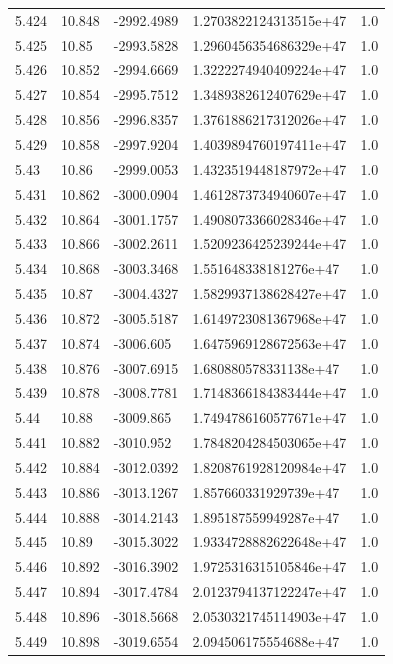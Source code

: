 \begin{tabular}{lllll}
5.424 & 10.848 & -2992.4989 & 1.2703822124313515e+47 & 1.0 \\
5.425 & 10.85 & -2993.5828 & 1.2960456354686329e+47 & 1.0 \\
5.426 & 10.852 & -2994.6669 & 1.3222274940409224e+47 & 1.0 \\
5.427 & 10.854 & -2995.7512 & 1.3489382612407629e+47 & 1.0 \\
5.428 & 10.856 & -2996.8357 & 1.3761886217312026e+47 & 1.0 \\
5.429 & 10.858 & -2997.9204 & 1.4039894760197411e+47 & 1.0 \\
5.43 & 10.86 & -2999.0053 & 1.4323519448187972e+47 & 1.0 \\
5.431 & 10.862 & -3000.0904 & 1.4612873734940607e+47 & 1.0 \\
5.432 & 10.864 & -3001.1757 & 1.4908073366028346e+47 & 1.0 \\
5.433 & 10.866 & -3002.2611 & 1.5209236425239244e+47 & 1.0 \\
5.434 & 10.868 & -3003.3468 & 1.551648338181276e+47 & 1.0 \\
5.435 & 10.87 & -3004.4327 & 1.5829937138628427e+47 & 1.0 \\
5.436 & 10.872 & -3005.5187 & 1.6149723081367968e+47 & 1.0 \\
5.437 & 10.874 & -3006.605 & 1.6475969128672563e+47 & 1.0 \\
5.438 & 10.876 & -3007.6915 & 1.680880578331138e+47 & 1.0 \\
5.439 & 10.878 & -3008.7781 & 1.7148366184383444e+47 & 1.0 \\
5.44 & 10.88 & -3009.865 & 1.7494786160577671e+47 & 1.0 \\
5.441 & 10.882 & -3010.952 & 1.7848204284503065e+47 & 1.0 \\
5.442 & 10.884 & -3012.0392 & 1.8208761928120984e+47 & 1.0 \\
5.443 & 10.886 & -3013.1267 & 1.857660331929739e+47 & 1.0 \\
5.444 & 10.888 & -3014.2143 & 1.895187559949287e+47 & 1.0 \\
5.445 & 10.89 & -3015.3022 & 1.9334728882622648e+47 & 1.0 \\
5.446 & 10.892 & -3016.3902 & 1.9725316315105846e+47 & 1.0 \\
5.447 & 10.894 & -3017.4784 & 2.0123794137122247e+47 & 1.0 \\
5.448 & 10.896 & -3018.5668 & 2.0530321745114903e+47 & 1.0 \\
5.449 & 10.898 & -3019.6554 & 2.094506175554688e+47 & 1.0 \\

\end{tabular}
